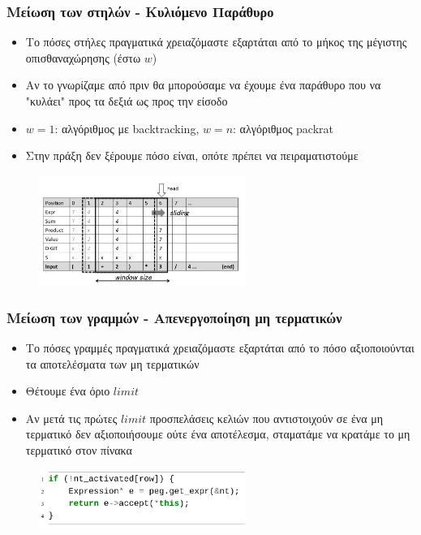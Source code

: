 \documentclass{beamer}
\begin{document}
\begin{frame}
  \frametitle{Μείωση των στηλών - Κυλιόμενο Παράθυρο}

	\begin{itemize}
	  \item Το πόσες στήλες πραγματικά χρειαζόμαστε εξαρτάται από το μήκος της μέγιστης οπισθαναχώρησης (έστω $w$)
	  \item Αν το γνωρίζαμε από πριν θα μπορούσαμε να έχουμε ένα παράθυρο που να "κυλάει" προς τα δεξιά ως προς την είσοδο
	  \item $w = 1$: αλγόριθμος με backtracking, $w = n$: αλγόριθμος packrat
	  \item Στην πράξη δεν ξέρουμε πόσο είναι, οπότε πρέπει να πειραματιστούμε
	\end{itemize}

\begin{figure}[h]
    \centering
	\includegraphics[width=0.60\textwidth]{../transcript/pics/slide_window}
\end{figure} 
\end{frame}

\begin{frame}
  \frametitle{Μείωση των γραμμών - Απενεργοποίηση μη τερματικών}

	\begin{itemize}
	  \item Το πόσες γραμμές πραγματικά χρειαζόμαστε εξαρτάται από το πόσο αξιοποιούνται τα αποτελέσματα των μη τερματικών
	  \item Θέτουμε ένα όριο $limit$
	  \item Αν μετά τις πρώτες $limit$ προσπελάσεις κελιών που αντιστοιχούν σε ένα μη τερματικό δεν αξιοποιήσουμε ούτε ένα αποτέλεσμα, σταματάμε να κρατάμε το μη τερματικό στον πίνακα
	\end{itemize}

\begin{figure}[h]
    \centering
	\includegraphics[width=0.60\textwidth]{pics/deactivated}
\end{figure} 
\end{frame}
\end{document}
